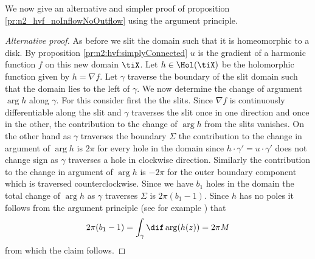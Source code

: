 We now give an alternative and simpler proof of proposition \ref{pr:n2_hvf_noInflowNoOutflow} using the argument principle.
\begin{proof}[Alternative proof]
  As before we slit the domain such that it is homeomorphic to a disk. By proposition \ref{pr:n2:hvf:simplyConnected} $u$ is the gradient of a
  harmonic function $f$ on this new domain $\tiX$. Let $h\in\Hol(\tiX)$ be the holomorphic function given by $h=\nabla f$.
  Let $\gamma$ traverse the boundary of the slit domain such that the domain lies to the left of $\gamma$.
  We now determine the change of argument $\arg h$ along $\gamma$. For this
  consider first the the slits. Since $\nabla f$ is continuously differentiable
  along the slit and $\gamma$ traverses the slit once in one direction and once in the other,
  the contribution to the change of $\arg h$ from the slits vanishes.
  On the other hand as $\gamma$ traverses the boundary $\Sigma$ the contribution to the change in
  argument of $\arg h$ is $2\pi$ for every hole in the domain 
  since $h\cdot\gamma'=u\cdot\gamma'$ does not change sign as $\gamma$ traverses a hole in clockwise direction.
  Similarly the contribution to the change in argument of $\arg h$ is $-2\pi$ for the outer boundary component
  which is traversed counterclockwise.
  Since we have $b_1$ holes in the domain the total change of $\arg h$ as $\gamma$ traverses $\Sigma$ is
  $2\pi(b_1-1)$.
  Since $h$ has no poles it follows from the argument principle (see for example \cite[Chapter VIII]{Gamelin2001}) that
  \begin{align*}
    2\pi(b_1-1)=\int_\gamma\dif\arg (h(z)) =  2\pi M
  \end{align*}
  from which the claim follows.
\end{proof}

